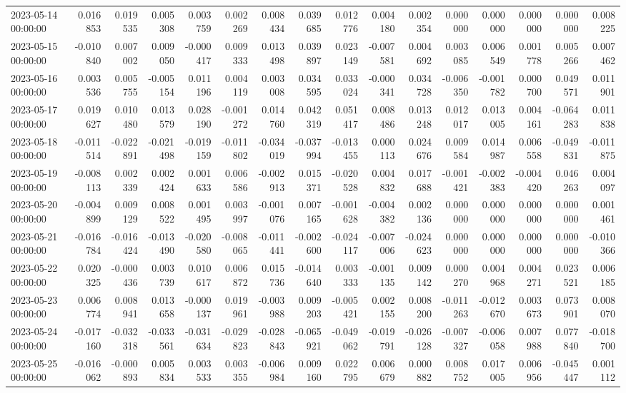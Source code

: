 \begin{tabular}{lrrrrrrrrrrrrrrr}
2023-05-14 00:00:00 & 0.016853 & 0.019535 & 0.005308 & 0.003759 & 0.002269 & 0.008434 & 0.039685 & 0.012776 & 0.004180 & 0.002354 & 0.000000 & 0.000000 & 0.000000 & 0.000000 & 0.008225 \\
2023-05-15 00:00:00 & -0.010840 & 0.007002 & 0.009050 & -0.000417 & 0.009333 & 0.013498 & 0.039897 & 0.023149 & -0.007581 & 0.004692 & 0.003085 & 0.006549 & 0.001778 & 0.005266 & 0.007462 \\
2023-05-16 00:00:00 & 0.003536 & 0.005755 & -0.005154 & 0.011196 & 0.004119 & 0.003008 & 0.034595 & 0.033024 & -0.000341 & 0.034728 & -0.006350 & -0.001782 & 0.000700 & 0.049571 & 0.011901 \\
2023-05-17 00:00:00 & 0.019627 & 0.010480 & 0.013579 & 0.028190 & -0.001272 & 0.014760 & 0.042319 & 0.051417 & 0.008486 & 0.013248 & 0.012017 & 0.013005 & 0.004161 & -0.064283 & 0.011838 \\
2023-05-18 00:00:00 & -0.011514 & -0.022891 & -0.021498 & -0.019159 & -0.011802 & -0.034019 & -0.037994 & -0.013455 & 0.000113 & 0.024676 & 0.009584 & 0.014987 & 0.006558 & -0.049831 & -0.011875 \\
2023-05-19 00:00:00 & -0.008113 & 0.002339 & 0.002424 & 0.001633 & 0.006586 & -0.002913 & 0.015371 & -0.020528 & 0.004832 & 0.017688 & -0.001421 & -0.002383 & -0.004420 & 0.046263 & 0.004097 \\
2023-05-20 00:00:00 & -0.004899 & 0.009129 & 0.008522 & 0.001495 & 0.003997 & -0.001076 & 0.007165 & -0.001628 & -0.004382 & 0.002136 & 0.000000 & 0.000000 & 0.000000 & 0.000000 & 0.001461 \\
2023-05-21 00:00:00 & -0.016784 & -0.016424 & -0.013490 & -0.020580 & -0.008065 & -0.011441 & -0.002600 & -0.024117 & -0.007006 & -0.024623 & 0.000000 & 0.000000 & 0.000000 & 0.000000 & -0.010366 \\
2023-05-22 00:00:00 & 0.020325 & -0.000436 & 0.003739 & 0.010617 & 0.006872 & 0.015736 & -0.014640 & 0.003333 & -0.001135 & 0.009142 & 0.000270 & 0.004968 & 0.004271 & 0.023521 & 0.006185 \\
2023-05-23 00:00:00 & 0.006774 & 0.008941 & 0.013658 & -0.000137 & 0.019961 & -0.003988 & 0.009203 & -0.005421 & 0.002155 & 0.008200 & -0.011263 & -0.012670 & 0.003673 & 0.073901 & 0.008070 \\
2023-05-24 00:00:00 & -0.017160 & -0.032318 & -0.033561 & -0.031634 & -0.029823 & -0.028843 & -0.065921 & -0.049062 & -0.019791 & -0.026128 & -0.007327 & -0.006058 & 0.007988 & 0.077840 & -0.018700 \\
2023-05-25 00:00:00 & -0.016062 & -0.000893 & 0.005834 & 0.003533 & 0.003355 & -0.006984 & 0.009160 & 0.022795 & 0.006679 & 0.000882 & 0.008752 & 0.017005 & 0.006956 & -0.045447 & 0.001112 \\

\end{tabular}
